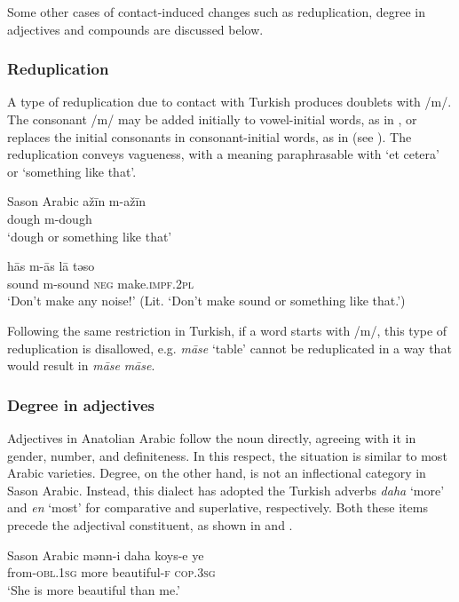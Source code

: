 \documentclass[output=paper]{langsci/langscibook}
\begin{document}
Some other cases of contact-induced changes such as reduplication, degree in adjectives and compounds are discussed below.



\subsubsection{Reduplication}

A type of reduplication due to contact with Turkish produces doublets with /m/. The consonant /m/ may be added initially to vowel-initial words, as in , or replaces the initial consonants in consonant-initial words, as in  (see \citealt{Akkus2017,Lahdo2009}). The reduplication conveys vagueness, with a meaning paraphrasable with `et cetera' or `something like that'.

\ea\label{redup} Sason Arabic
		\ea \label{redup1}\gll a\v{z}\={i}n m-a\v{z}\={i}n\\
        dough m-dough\\
        \glt `dough or something like that'


	\ex \label{redup2} \gll h\={a}s m-\={a}s l\={a} təso \\
        sound m-sound \textsc{neg} make.\textsc{impf.2pl}\\
        \glt `Don't make any noise!' (Lit. `Don't make sound or something like that.') %
\z
\z

\noindent Following the same restriction in Turkish, if a word starts with /m/, this type of reduplication is disallowed, e.g. \textit{m\={a}se} `table' cannot be reduplicated in a way that would result in \textit{m\={a}se} \textit{m\={a}se}. 


\subsubsection{Degree in adjectives} 
Adjectives in Anatolian Arabic follow the noun directly, agreeing with it in gender, number, and definiteness. In this respect, the situation is similar to most Arabic varieties. Degree, on the other hand, is not an inflectional category in Sason Arabic. Instead, this dialect has adopted the Turkish adverbs \textit{daha} `more' and \textit{en} `most' for comparative and superlative, respectively. Both these items precede the adjectival constituent, as shown in  and .

\ea \label{adj} Sason Arabic 
		\ea \label{adj1}\gll mənn-i daha koys-e ye\\
   from-\textsc{obl.1sg} more beautiful-\textsc{f} \textsc{cop.3sg} \\
        \glt `She is more beautiful than me.'
\end{document}
